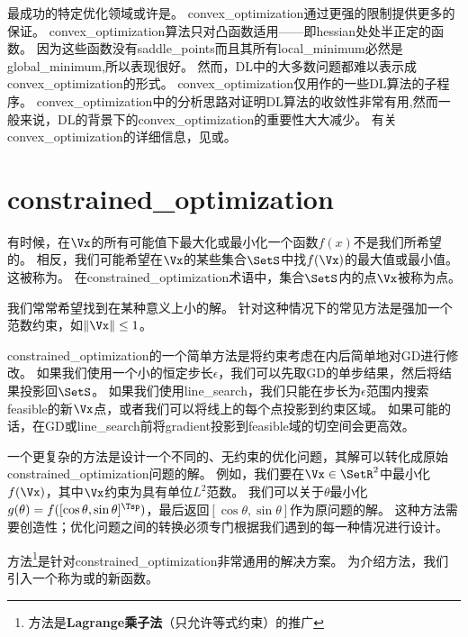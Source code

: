 
最成功的特定优化领域或许是。
\gls{convex_optimization}通过更强的限制提供更多的保证。
\gls{convex_optimization}算法只对凸函数适用——即\gls{hessian}处处半正定的函数。
因为这些函数没有\gls{saddle_points}而且其所有\gls{local_minimum}必然是\gls{global_minimum},所以表现很好。
然而，\gls{DL}中的大多数问题都难以表示成\gls{convex_optimization}的形式。
\gls{convex_optimization}仅用作的一些\gls{DL}算法的子程序。
\gls{convex_optimization}中的分析思路对证明\gls{DL}算法的收敛性非常有用,然而一般来说，\gls{DL}的背景下的\gls{convex_optimization}的重要性大大减少。 
有关\gls{convex_optimization}的详细信息，见\cite{Boyd04}或\cite{rockafellar1997convex}。


\section{\gls{constrained_optimization}}
\label{sec:constrained_optimization}
有时候，在$\Vx$的所有可能值下最大化或最小化一个函数$f(x)$不是我们所希望的。
相反，我们可能希望在$\Vx$的某些集合$\SetS$中找$f(\Vx)$的最大值或最小值。
这被称为。
在\gls{constrained_optimization}术语中，集合$\SetS$内的点$\Vx$被称为点。

我们常常希望找到在某种意义上小的解。
针对这种情况下的常见方法是强加一个范数约束，如$\| \Vx \| \leq 1$。

\gls{constrained_optimization}的一个简单方法是将约束考虑在内后简单地对\gls{GD}进行修改。
如果我们使用一个小的恒定步长$\epsilon$，我们可以先取\gls{GD}的单步结果，然后将结果投影回$\SetS$。
如果我们使用\gls{line_search}，我们只能在步长为$\epsilon$范围内搜索\gls{feasible}的新$\Vx$点，或者我们可以将线上的每个点投影到约束区域。
如果可能的话，在\gls{GD}或\gls{line_search}前将\gls{gradient}投影到\gls{feasible}域的切空间会更高效\citep{rosen1960}。

一个更复杂的方法是设计一个不同的、无约束的优化问题，其解可以转化成原始\gls{constrained_optimization}问题的解。
例如，我们要在$\Vx \in \SetR^2$中最小化$f(\Vx)$，其中$\Vx$约束为具有单位$L^2$范数。
我们可以关于$\theta$最小化$g(\theta) = f([\cos \theta, \sin \theta]^\Tsp)$，最后返回$[\cos \theta, \sin \theta]$作为原问题的解。
这种方法需要创造性；优化问题之间的转换必须专门根据我们遇到的每一种情况进行设计。


方法\footnote{方法是\textbf{Lagrange乘子法}（只允许等式约束）的推广}是针对\gls{constrained_optimization}非常通用的解决方案。
为介绍方法，我们引入一个称为或的新函数。

